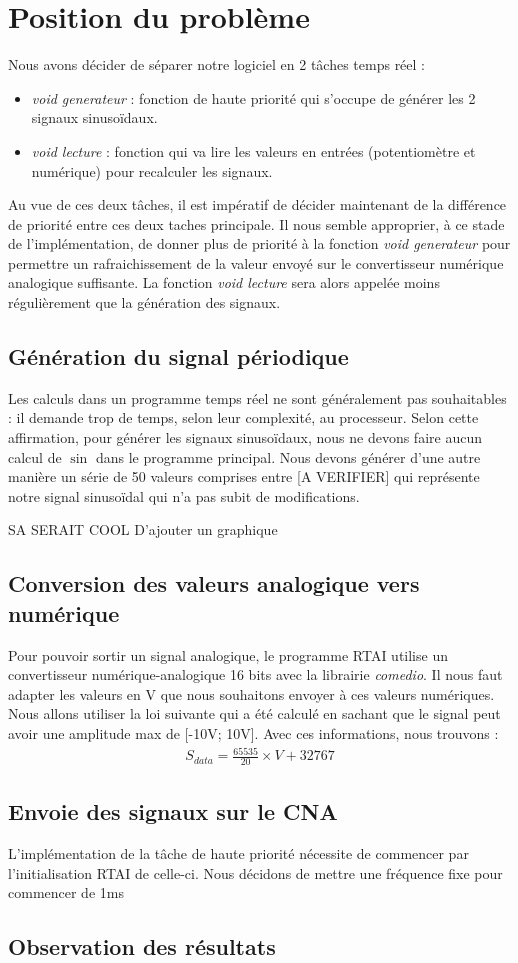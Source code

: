\section{Position du problème}
Nous avons décider de séparer notre logiciel en 2 tâches temps réel : \begin{itemize}
\item \emph{void generateur} : fonction de haute priorité qui s'occupe de générer les 2 signaux sinusoïdaux. 
\item \emph{void lecture} : fonction qui va lire les valeurs en entrées (potentiomètre et numérique) pour recalculer les signaux.
\end{itemize}
Au vue de ces deux tâches, il est impératif de décider maintenant de la différence de priorité entre ces deux taches principale. Il nous semble approprier, à ce stade de l'implémentation, de donner plus de priorité à la fonction \emph{void generateur} pour permettre un rafraichissement de la valeur envoyé sur le convertisseur numérique analogique suffisante. La fonction \emph{void lecture} sera alors appelée moins régulièrement que la génération des signaux.
\subsection{Génération du signal périodique}
Les calculs dans un programme temps réel ne sont généralement pas souhaitables : il demande trop de temps, selon leur complexité, au processeur. Selon cette affirmation, pour générer les signaux sinusoïdaux, nous ne devons faire aucun calcul de $\sin$ dans le programme principal. Nous devons générer d'une autre manière un série de 50 valeurs comprises entre [A VERIFIER] qui représente notre signal sinusoïdal qui n'a pas subit de modifications.

SA SERAIT COOL D'ajouter un graphique
\subsection{Conversion des valeurs analogique vers numérique}
Pour pouvoir sortir un signal analogique, le programme RTAI utilise un convertisseur numérique-analogique 16 bits avec la librairie \emph{comedio}. Il nous faut adapter les valeurs en V que nous souhaitons envoyer à ces valeurs numériques. Nous allons utiliser la loi suivante qui a été calculé en sachant que le signal peut avoir une amplitude max de [-10V; 10V]. Avec ces informations, nous trouvons : \begin{align*}
S_{data} = \frac{65535}{20}\times V + 32767
\end{align*}

\subsection{Envoie des signaux sur le CNA}
L'implémentation de la tâche de haute priorité nécessite de commencer par l'initialisation RTAI de celle-ci. Nous décidons de mettre une fréquence fixe pour commencer de 1ms 

\subsection{Observation des résultats}
